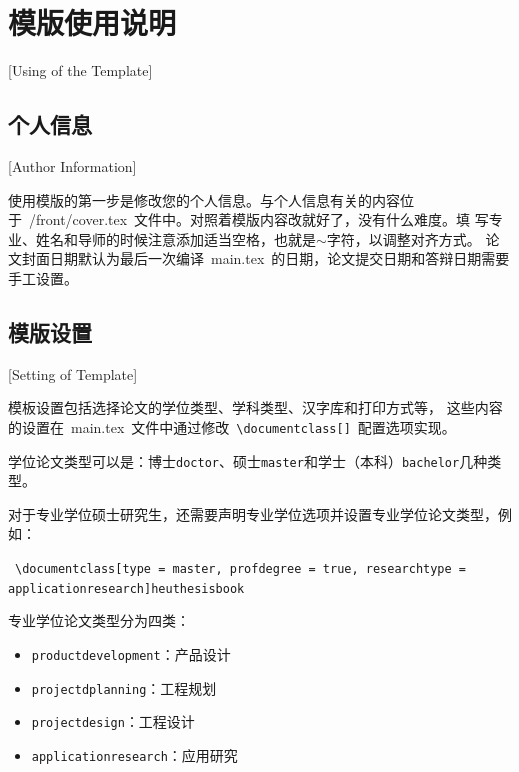 
%
%
%

\chapter{模版使用说明}[Using of the Template]
\label{chap03}

\section{个人信息}[Author Information]

使用模版的第一步是修改您的个人信息。与个人信息有关的内容位
于~{/front/cover.tex}~文件中。对照着模版内容改就好了，没有什么难度。填
写专业、姓名和导师的时候注意添加适当空格，也就是$\sim$字符，以调整对齐方式。
论文封面日期默认为最后一次编译~main.tex~的日期，论文提交日期和答辩日期需要手工设置。

\section{模版设置}[Setting of Template]

模板设置包括选择论文的学位类型、学科类型、汉字库和打印方式等，
这些内容的设置在~main.tex~文件中通过修改~\texttt{\textbackslash documentclass[]}~配置选项实现。

学位论文类型可以是：博士\texttt{doctor}、硕士\texttt{master}和学士（本科）\texttt{bachelor}几种类型。

对于专业学位硕士研究生，还需要声明专业学位选项并设置专业学位论文类型，例如：

~\texttt{\textbackslash documentclass[type = master, profdegree = true, researchtype = applicationresearch]{heuthesisbook}}

专业学位论文类型分为四类：
\begin{itemize}
  \item \texttt{productdevelopment}：产品设计
  \item \texttt{projectdplanning}：工程规划
  \item \texttt{projectdesign}：工程设计
  \item \texttt{applicationresearch}：应用研究
\end{itemize}

